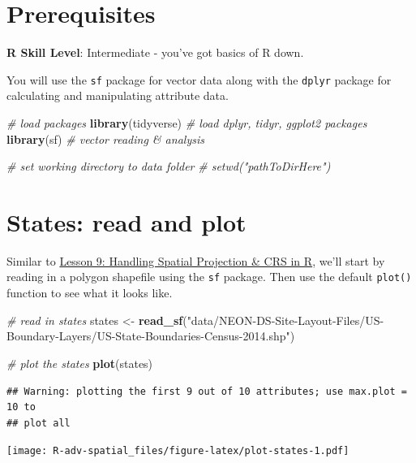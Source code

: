 \documentclass[]{book}
\newenvironment{Shaded}{\begin{snugshade}}{\end{snugshade}}
\newcommand{\KeywordTok}[1]{\textcolor[rgb]{0.13,0.29,0.53}{\textbf{{#1}}}}
\newcommand{\StringTok}[1]{\textcolor[rgb]{0.31,0.60,0.02}{{#1}}}
\newcommand{\CommentTok}[1]{\textcolor[rgb]{0.56,0.35,0.01}{\textit{{#1}}}}
\newcommand{\NormalTok}[1]{{#1}}
\theoremstyle{definition}
\theoremstyle{definition}
\theoremstyle{definition}
\theoremstyle{remark}
\begin{document}
\section{Prerequisites}\label{prerequisites}

\textbf{R Skill Level}: Intermediate - you've got basics of R down.

You will use the \texttt{sf} package for vector data along with the
\texttt{dplyr} package for calculating and manipulating attribute data.

\begin{Shaded}
\begin{Highlighting}[]
\CommentTok{# load packages}
\KeywordTok{library}\NormalTok{(tidyverse)  }\CommentTok{# load dplyr, tidyr, ggplot2 packages}
\KeywordTok{library}\NormalTok{(sf)         }\CommentTok{# vector reading & analysis}

\CommentTok{# set working directory to data folder}
\CommentTok{# setwd("pathToDirHere")}
\end{Highlighting}
\end{Shaded}

\section{States: read and plot}\label{states-read-and-plot}

Similar to
\href{https://jsta.github.io/R-spatial-raster-vector-lesson/09-vector-when-data-dont-line-up-crs/}{Lesson
9: Handling Spatial Projection \& CRS in R}, we'll start by reading in a
polygon shapefile using the \texttt{sf} package. Then use the default
\texttt{plot()} function to see what it looks like.

\begin{Shaded}
\begin{Highlighting}[]
\CommentTok{# read in states}
\NormalTok{states <-}\StringTok{ }\KeywordTok{read_sf}\NormalTok{(}\StringTok{"data/NEON-DS-Site-Layout-Files/US-Boundary-Layers/US-State-Boundaries-Census-2014.shp"}\NormalTok{)}

\CommentTok{# plot the states}
\KeywordTok{plot}\NormalTok{(states)}
\end{Highlighting}
\end{Shaded}

\begin{verbatim}
## Warning: plotting the first 9 out of 10 attributes; use max.plot = 10 to
## plot all
\end{verbatim}

\texttt{[image: R-adv-spatial\_files/figure-latex/plot-states-1.pdf]}
\end{document}

